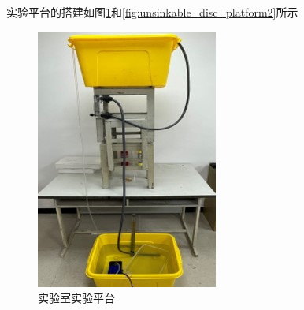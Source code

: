 \documentclass[UTF8]{gapd}
\begin{document}
实验平台的搭建如图\ref{fig:unsinkable_disc_platform1}和\ref{fig:unsinkable_disc_platform2}所示
\begin{figure}[!htbp]%
  \centering
  \includegraphics[width=0.8\columnwidth]{images/platform1.jpg}
  \caption{实验室实验平台}
  \label{fig:unsinkable_disc_platform1}%
\end{figure}
\end{document}
